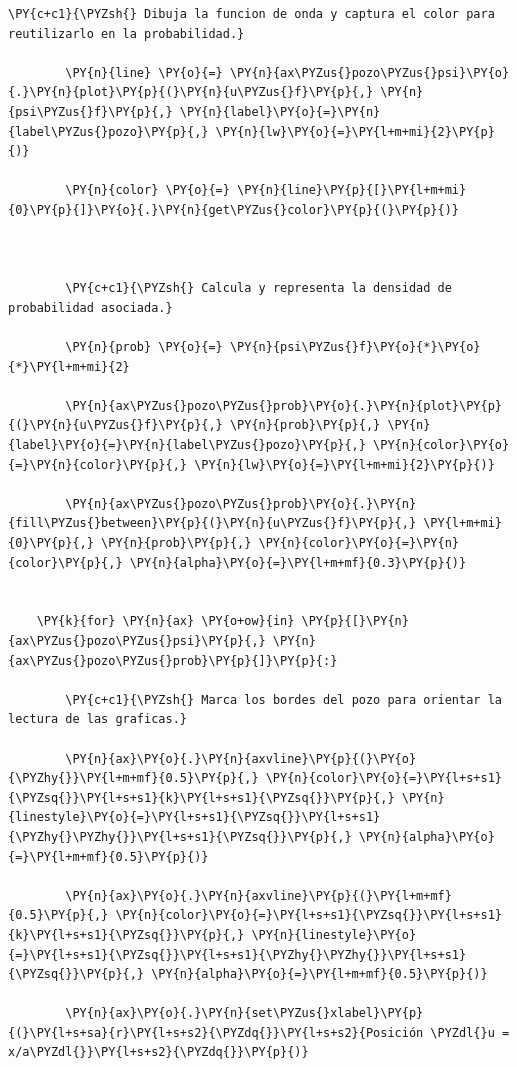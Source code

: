 \documentclass[11pt]{article}
\makeatletter
\def\PY@reset{\let\PY@it=\relax \let\PY@bf=\relax \let\PY@ul=\relax \let\PY@tc=\relax \let\PY@bc=\relax \let\PY@ff=\relax}
\def\PY@tok#1{\csname PY@tok@#1\endcsname}
\def\PY@toks#1+{\ifx\relax#1\empty\else \PY@tok{#1}\expandafter\PY@toks\fi}
\def\PY@do#1{\PY@bc{\PY@tc{\PY@ul{\PY@it{\PY@bf{\PY@ff{#1}}}}}}}
\def\PY#1#2{\PY@reset\PY@toks#1+\relax+\PY@do{#2}}
\makeatother
\begin{document}
\begin{tcolorbox}[breakable, size=fbox, boxrule=1pt, pad at break*=1mm,colback=cellbackground, colframe=cellborder]
\begin{Verbatim}[commandchars=\\\{\}]
        \PY{c+c1}{\PYZsh{} Dibuja la funcion de onda y captura el color para reutilizarlo en la probabilidad.}

        \PY{n}{line} \PY{o}{=} \PY{n}{ax\PYZus{}pozo\PYZus{}psi}\PY{o}{.}\PY{n}{plot}\PY{p}{(}\PY{n}{u\PYZus{}f}\PY{p}{,} \PY{n}{psi\PYZus{}f}\PY{p}{,} \PY{n}{label}\PY{o}{=}\PY{n}{label\PYZus{}pozo}\PY{p}{,} \PY{n}{lw}\PY{o}{=}\PY{l+m+mi}{2}\PY{p}{)}

        \PY{n}{color} \PY{o}{=} \PY{n}{line}\PY{p}{[}\PY{l+m+mi}{0}\PY{p}{]}\PY{o}{.}\PY{n}{get\PYZus{}color}\PY{p}{(}\PY{p}{)}

        

        \PY{c+c1}{\PYZsh{} Calcula y representa la densidad de probabilidad asociada.}

        \PY{n}{prob} \PY{o}{=} \PY{n}{psi\PYZus{}f}\PY{o}{*}\PY{o}{*}\PY{l+m+mi}{2}

        \PY{n}{ax\PYZus{}pozo\PYZus{}prob}\PY{o}{.}\PY{n}{plot}\PY{p}{(}\PY{n}{u\PYZus{}f}\PY{p}{,} \PY{n}{prob}\PY{p}{,} \PY{n}{label}\PY{o}{=}\PY{n}{label\PYZus{}pozo}\PY{p}{,} \PY{n}{color}\PY{o}{=}\PY{n}{color}\PY{p}{,} \PY{n}{lw}\PY{o}{=}\PY{l+m+mi}{2}\PY{p}{)}

        \PY{n}{ax\PYZus{}pozo\PYZus{}prob}\PY{o}{.}\PY{n}{fill\PYZus{}between}\PY{p}{(}\PY{n}{u\PYZus{}f}\PY{p}{,} \PY{l+m+mi}{0}\PY{p}{,} \PY{n}{prob}\PY{p}{,} \PY{n}{color}\PY{o}{=}\PY{n}{color}\PY{p}{,} \PY{n}{alpha}\PY{o}{=}\PY{l+m+mf}{0.3}\PY{p}{)}


    \PY{k}{for} \PY{n}{ax} \PY{o+ow}{in} \PY{p}{[}\PY{n}{ax\PYZus{}pozo\PYZus{}psi}\PY{p}{,} \PY{n}{ax\PYZus{}pozo\PYZus{}prob}\PY{p}{]}\PY{p}{:}

        \PY{c+c1}{\PYZsh{} Marca los bordes del pozo para orientar la lectura de las graficas.}

        \PY{n}{ax}\PY{o}{.}\PY{n}{axvline}\PY{p}{(}\PY{o}{\PYZhy{}}\PY{l+m+mf}{0.5}\PY{p}{,} \PY{n}{color}\PY{o}{=}\PY{l+s+s1}{\PYZsq{}}\PY{l+s+s1}{k}\PY{l+s+s1}{\PYZsq{}}\PY{p}{,} \PY{n}{linestyle}\PY{o}{=}\PY{l+s+s1}{\PYZsq{}}\PY{l+s+s1}{\PYZhy{}\PYZhy{}}\PY{l+s+s1}{\PYZsq{}}\PY{p}{,} \PY{n}{alpha}\PY{o}{=}\PY{l+m+mf}{0.5}\PY{p}{)}

        \PY{n}{ax}\PY{o}{.}\PY{n}{axvline}\PY{p}{(}\PY{l+m+mf}{0.5}\PY{p}{,} \PY{n}{color}\PY{o}{=}\PY{l+s+s1}{\PYZsq{}}\PY{l+s+s1}{k}\PY{l+s+s1}{\PYZsq{}}\PY{p}{,} \PY{n}{linestyle}\PY{o}{=}\PY{l+s+s1}{\PYZsq{}}\PY{l+s+s1}{\PYZhy{}\PYZhy{}}\PY{l+s+s1}{\PYZsq{}}\PY{p}{,} \PY{n}{alpha}\PY{o}{=}\PY{l+m+mf}{0.5}\PY{p}{)}

        \PY{n}{ax}\PY{o}{.}\PY{n}{set\PYZus{}xlabel}\PY{p}{(}\PY{l+s+sa}{r}\PY{l+s+s2}{\PYZdq{}}\PY{l+s+s2}{Posición \PYZdl{}u = x/a\PYZdl{}}\PY{l+s+s2}{\PYZdq{}}\PY{p}{)}


\end{Verbatim}
\end{tcolorbox}
\end{document}
